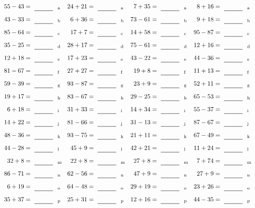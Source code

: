 \documentclass
[
  draft    = true,
  fontsize = 11pt,
  parskip  = half-
]
{scrartcl}
\begin{document}
\clearpage
\begin{align*}
    \pline{55-43}&=\rline{a}
  & \pline{24+21}&=\rline{a}
  & \pline{7+35}&=\rline{a}
  & \pline{8+16}&=\rline{a} \\[1ex]
    \pline{43-33}&=\rline{b}
  & \pline{6+36}&=\rline{b}
  & \pline{73-61}&=\rline{b}
  & \pline{9+18}&=\rline{b} \\[1ex]
    \pline{85-64}&=\rline{c}
  & \pline{17+7}&=\rline{c}
  & \pline{14+58}&=\rline{c}
  & \pline{95-87}&=\rline{c} \\[1ex]
    \pline{35-25}&=\rline{d}
  & \pline{28+17}&=\rline{d}
  & \pline{75-61}&=\rline{d}
  & \pline{12+16}&=\rline{d} \\[1ex]
    \pline{12+18}&=\rline{e}
  & \pline{17+23}&=\rline{e}
  & \pline{43-22}&=\rline{e}
  & \pline{44-36}&=\rline{e} \\[1ex]
    \pline{81-67}&=\rline{f}
  & \pline{27+27}&=\rline{f}
  & \pline{19+8}&=\rline{f}
  & \pline{11+13}&=\rline{f} \\[1ex]
    \pline{59-39}&=\rline{g}
  & \pline{93-87}&=\rline{g}
  & \pline{23+9}&=\rline{g}
  & \pline{52+11}&=\rline{g} \\[1ex]
    \pline{19+17}&=\rline{h}
  & \pline{83-67}&=\rline{h}
  & \pline{29-25}&=\rline{h}
  & \pline{65-53}&=\rline{h} \\[1ex]
    \pline{6+18}&=\rline{i}
  & \pline{31+33}&=\rline{i}
  & \pline{14+34}&=\rline{i}
  & \pline{55-37}&=\rline{i} \\[1ex]
    \pline{14+22}&=\rline{j}
  & \pline{81-66}&=\rline{j}
  & \pline{31-13}&=\rline{j}
  & \pline{87-67}&=\rline{j} \\[1ex]
    \pline{48-36}&=\rline{k}
  & \pline{93-75}&=\rline{k}
  & \pline{21+11}&=\rline{k}
  & \pline{67-49}&=\rline{k} \\[1ex]
    \pline{44-28}&=\rline{l}
  & \pline{45+9}&=\rline{l}
  & \pline{42+21}&=\rline{l}
  & \pline{11+24}&=\rline{l} \\[1ex]
    \pline{32+8}&=\rline{m}
  & \pline{22+8}&=\rline{m}
  & \pline{27+8}&=\rline{m}
  & \pline{7+74}&=\rline{m} \\[1ex]
    \pline{86-71}&=\rline{n}
  & \pline{62-56}&=\rline{n}
  & \pline{47+9}&=\rline{n}
  & \pline{27+9}&=\rline{n} \\[1ex]
    \pline{6+19}&=\rline{o}
  & \pline{64-48}&=\rline{o}
  & \pline{29+19}&=\rline{o}
  & \pline{23+26}&=\rline{o} \\[1ex]
    \pline{35+37}&=\rline{p}
  & \pline{25+31}&=\rline{p}
  & \pline{12+16}&=\rline{p}
  & \pline{44-35}&=\rline{p}
\end{align*}
\end{document}
